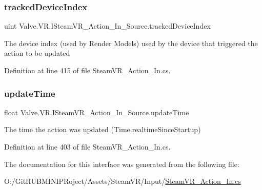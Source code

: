 \subsubsection{\texorpdfstring{trackedDeviceIndex}{trackedDeviceIndex}}
{\footnotesize\ttfamily uint Valve.\+V\+R.\+I\+Steam\+V\+R\+\_\+\+Action\+\_\+\+In\+\_\+\+Source.\+tracked\+Device\+Index\hspace{0.3cm}{\ttfamily [get]}}



The device index (used by Render Models) used by the device that triggered the action to be updated 



Definition at line 415 of file Steam\+V\+R\+\_\+\+Action\+\_\+\+In.\+cs.

\mbox{\label{interface_valve_1_1_v_r_1_1_i_steam_v_r___action___in___source_ada770da3da523e6bba5c7b5501a8da9e}} 
\subsubsection{\texorpdfstring{updateTime}{updateTime}}
{\footnotesize\ttfamily float Valve.\+V\+R.\+I\+Steam\+V\+R\+\_\+\+Action\+\_\+\+In\+\_\+\+Source.\+update\+Time\hspace{0.3cm}{\ttfamily [get]}}



The time the action was updated (Time.\+realtime\+Since\+Startup) 



Definition at line 403 of file Steam\+V\+R\+\_\+\+Action\+\_\+\+In.\+cs.



The documentation for this interface was generated from the following file\+:\begin{DoxyCompactItemize}
\item 
O\+:/\+Git\+H\+U\+B\+M\+I\+N\+I\+P\+Roject/\+Assets/\+Steam\+V\+R/\+Input/\mbox{\hyperlink{_steam_v_r___action___in_8cs}{Steam\+V\+R\+\_\+\+Action\+\_\+\+In.\+cs}}\end{DoxyCompactItemize}
